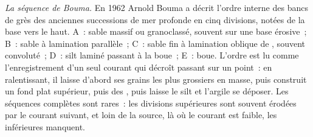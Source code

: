 \emph{La séquence de Bouma.} En 1962 Arnold Bouma a décrit l'ordre interne des
bancs de grès des anciennes successions de mer profonde en cinq divisions, notées
de la base vers le haut. A~: sable massif ou granoclassé, souvent sur une base érosive~; B~: sable
à lamination parallèle~; C~: sable fin à lamination oblique de , souvent
convoluté~; D~: silt laminé passant à la boue~; E~: boue. L'ordre est lu comme
l'enregistrement d'un seul courant qui décroît passant sur un point~: en ralentissant, il laisse
d'abord ses grains les plus grossiers en masse, puis construit un fond plat supérieur, puis
des , puis laisse le silt et l'argile se déposer. Les séquences complètes sont rares~: les
divisions supérieures sont souvent érodées par le courant suivant, et loin de la source,
là où le courant est faible, les inférieures manquent.

